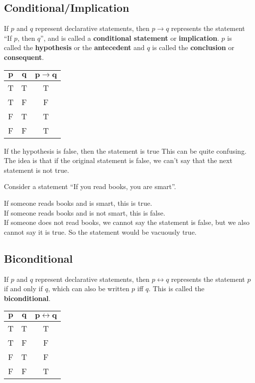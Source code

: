 \documentclass[../notes.tex]{subfiles}
\begin{document}
			\subsection[Conditional]{Conditional/Implication}
				If $p$ and $q$ represent declarative statements, then $p \rightarrow q$ represents the statement ``If $p$, then $q$'', and is called a \textbf{conditional statement} or \textbf{implication}. $p$ is called the \textbf{hypothesis} or the \textbf{antecedent} and $q$ is called the \textbf{conclusion} or \textbf{consequent}.
				\begin{center}
					\begin{tabular}{|c c | c|}
						\hline
						$\mathbf{p}$ & $\mathbf{q}$ & $\mathbf{p \rightarrow q}$\\
						\hline
						T & T & T\\
						T & F & F\\
						F & T & T\\
						F & F & T\\
						\hline
					\end{tabular}	
				\end{center}
				\begin{sidenote}{If the hypothesis is false, then the statement is true}
					This can be quite confusing. The idea is that if the original statement is false, we can't say that the next statement is not true.
					\begin{example}
						Consider a statement ``If you read books, you are smart''.
						\begin{indentparagraph}
							If someone reads books and is smart, this is true.\\
							If someone reads books and is not smart, this is false.\\
							If someone does not read books, we cannot say the statement is false, but we also cannot say it is true. So the statement would be vacuously true.
						\end{indentparagraph}
					\end{example} 
				\end{sidenote}
			\pagebreak
			\subsection{Biconditional}
				If $p$ and $q$ represent declarative statements, then $p \leftrightarrow q$ represents the statement $p$ if and only if $q$, which can also be written $p$ iff $q$. This is called the \textbf{biconditional}.
				\begin{center}
					\begin{tabular}{|c c | c|}
						\hline
						$\mathbf{p}$ & $\mathbf{q}$ & $\mathbf{p \leftrightarrow q}$\\
						\hline
						T & T & T\\
						T & F & F\\
						F & T & F\\
						F & F & T\\
						\hline
					\end{tabular}	
				\end{center}
\end{document}
